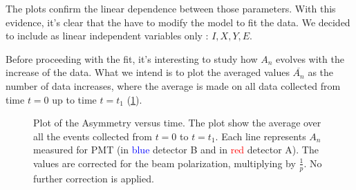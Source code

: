 The plots confirm the linear dependence between those parameters. With this evidence, it's clear that the have to modify the model to fit the data. We decided to include as linear independent variables only : $I,X,Y,E$.

Before proceeding with the fit, it's interesting to study how $A_{n}$ evolves with the increase of the data. What we intend is to plot the averaged values $\overline{A_{n}}$ as the number of data increases, where the average is made on all data collected from time $t = 0$ up to time $t = t_{1}$ (\ref{fig:AsymOverTime}). 

\begin{figure}[hbtp]
\centering


\caption{Plot of the Asymmetry versus time. The plot show the average over all the events collected from $t = 0$ to $t = t_{1}$. Each line represents $A_{n}$ measured for  PMT (in \textcolor{blue}{blue} detector B and in \textcolor{red}{red} detector A). The values are corrected for the beam polarization, multiplying by $\frac{1}{p}$. No further correction is applied.}
\label{fig:AsymOverTime}
\end{figure}

